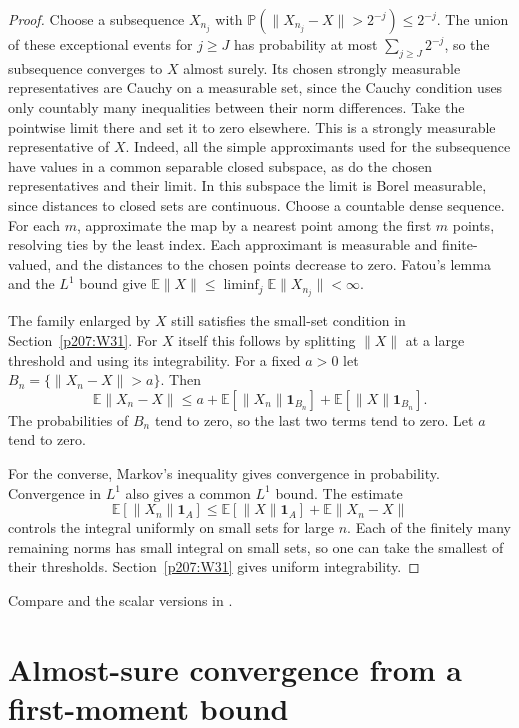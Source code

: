 \documentclass[11pt,oneside,openany]{book}
\theoremstyle{plain}
\theoremstyle{definition}
\theoremstyle{remark}
\begin{document}
\begin{proof}
Choose a subsequence \(X_{n_j}\) with
\(\mathbb P(\lVert X_{n_j}-X\rVert>2^{-j})\le2^{-j}\).
The union of these exceptional events for \(j\ge J\) has probability
at most \(\sum_{j\ge J}2^{-j}\), so the subsequence converges to \(X\)
almost surely. Its chosen strongly measurable representatives are
Cauchy on a measurable set, since the Cauchy condition uses only
countably many inequalities between their norm differences.
Take the pointwise limit there and set it to zero elsewhere. This
is a strongly measurable representative of \(X\).
Indeed, all the simple approximants used for the subsequence have
values in a common separable closed subspace, as do the chosen
representatives and their limit. In this subspace the limit is
Borel measurable, since distances to closed sets are continuous.
Choose a countable dense sequence. For each \(m\), approximate the
map by a nearest point among the first \(m\) points, resolving ties
by the least index. Each approximant is measurable and finite-valued,
and the distances to the chosen points decrease to zero.
Fatou's lemma and the \(L^1\) bound give
\(\mathbb E\lVert X\rVert\le\liminf_j\mathbb E\lVert X_{n_j}\rVert
<\infty\).

The family enlarged by \(X\) still satisfies the small-set
condition in Section~\ref{p207:W31}. For \(X\) itself this follows
by splitting \(\lVert X\rVert\) at a large threshold and using
its integrability. For a fixed \(a>0\) let
\(B_n=\{\lVert X_n-X\rVert>a\}\). Then
\[
 \mathbb E\lVert X_n-X\rVert
 \le a+\mathbb E[\lVert X_n\rVert\mathbf 1_{B_n}]
       +\mathbb E[\lVert X\rVert\mathbf 1_{B_n}].
\]
The probabilities of \(B_n\) tend to zero, so the last two terms
tend to zero. Let \(a\) tend to zero.

For the converse, Markov's inequality gives convergence in probability.
Convergence in \(L^1\) also gives a common \(L^1\) bound. The estimate
\[
 \mathbb E[\lVert X_n\rVert\mathbf 1_A]
 \le \mathbb E[\lVert X\rVert\mathbf 1_A]
       +\mathbb E\lVert X_n-X\rVert
\]
controls the integral uniformly on small sets for large \(n\).
Each of the finitely many remaining norms has small integral on
small sets, so one can take the smallest of their thresholds.
Section~\ref{p207:W31} gives uniform integrability.
\end{proof}

\noindent
Compare \cite[Theorem 5.12]{Kallenberg} and the scalar versions in
\cite{P105,D11}.

\section{Almost-sure convergence from a first-moment bound}
\label{p207:W33}
\end{document}
